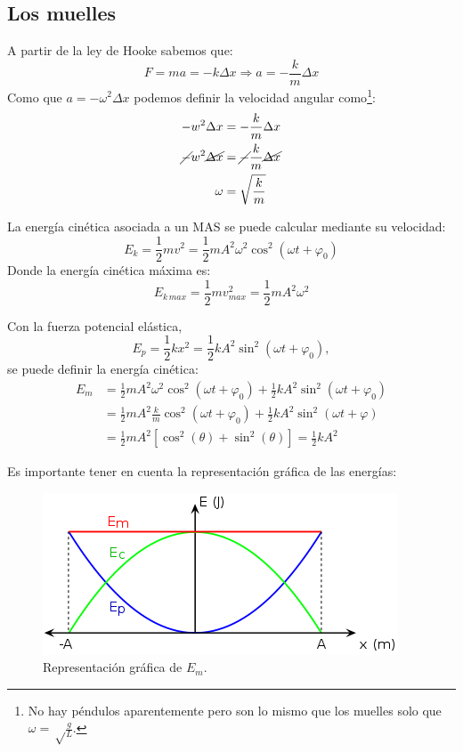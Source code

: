 \documentclass[arial,a4paper,print]{article}
\begin{document}
\subsection{Los muelles}
A partir de la ley de Hooke sabemos que:
\begin{equation*}
	F = ma = -k\Delta x \Rightarrow a = -\frac k m \Delta x
\end{equation*}
Como que $a = -\omega^{2}\Delta x$ podemos definir la velocidad angular como\footnote{No hay péndulos aparentemente pero son lo mismo que los muelles solo que $\omega = \sqrt\frac gL$. }:
\begin{align*}
	- w^{2}\Delta x &= - \frac{k}{m}\Delta x \\
	\cancel{-} w^{2}\cancel{\Delta x} &= \cancel{-} \frac{k}{m}\cancel{\Delta x} \\
	\omega &= \sqrt{\frac{k}{m}}
\end{align*}

La energía cinética asociada a un MAS se puede calcular mediante su velocidad:
\begin{equation*}
	E_{k} = \frac12 mv^{2} = \frac12 m A^{2}\omega^{2}\cos^{2}(\omega t + \varphi_0)
\end{equation*}
Donde la energía cinética máxima es:
\begin{equation*}
	E_{k\,max} = \frac12 mv^{2}_{max} = \frac12 mA^{2}\omega^2
\end{equation*}

Con la fuerza potencial elástica, 
\begin{equation*}
	E_{p} = \frac12 kx^{2} = \frac12 kA^{2}\sin^{2}(\omega t + \varphi_0), 
\end{equation*}  
se puede definir la energía cinética:
\begin{align*}
	E_{m} &= \frac12 mA^{2}\omega^{2}\cos^2(\omega t + \varphi_0) + \frac12 kA^{2}\sin^{2}(\omega t + \varphi_0)\\
	&= \frac12 mA^{2}\frac km \cos^{2}(\omega t + \varphi_0) + \frac12 kA^{2}\sin^2(\omega t + \varphi) \\
	&= \frac12 mA^{2}\left[\cos^2(\theta) + \sin^{2}(\theta)\right] = \frac12 kA^{2}
\end{align*}

Es importante tener en cuenta la representación gráfica de las energías:
\begin{figure}[h]
	\centering
	\includegraphics[width=0.5\linewidth]{figures/Energia_MAS}
	\caption{Representación gráfica de $E_{m}$.}
	\label{fig:energiamas}
\end{figure}
\end{document}
